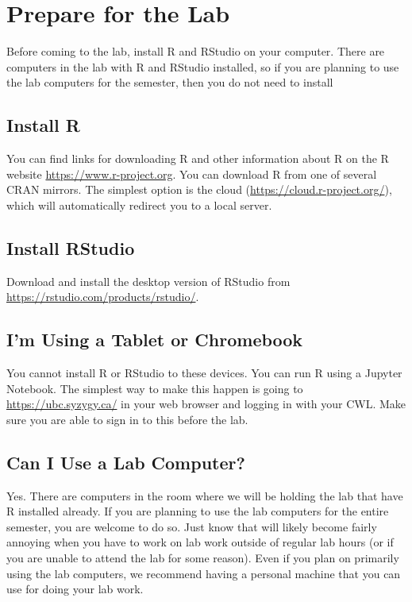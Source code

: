 \documentclass[
]{book}
\begin{document}
\hypertarget{prepare-for-the-lab}{%
\section{Prepare for the Lab}\label{prepare-for-the-lab}}

Before coming to the lab, install R and RStudio on your computer. There are computers in the lab with R and RStudio installed, so if you are planning to use the lab computers for the semester, then you do not need to install

\hypertarget{install-r}{%
\subsection{Install R}\label{install-r}}

You can find links for downloading R and other information about R on the R website \url{https://www.r-project.org}. You can download R from one of several CRAN mirrors. The simplest option is the cloud (\url{https://cloud.r-project.org/}), which will automatically redirect you to a local server.

\hypertarget{install-rstudio}{%
\subsection{Install RStudio}\label{install-rstudio}}

Download and install the desktop version of RStudio from \url{https://rstudio.com/products/rstudio/}.

\hypertarget{im-using-a-tablet-or-chromebook}{%
\subsection{I'm Using a Tablet or Chromebook}\label{im-using-a-tablet-or-chromebook}}

You cannot install R or RStudio to these devices. You can run R using a Jupyter Notebook. The simplest way to make this happen is going to \url{https://ubc.syzygy.ca/} in your web browser and logging in with your CWL. Make sure you are able to sign in to this before the lab.

\hypertarget{can-i-use-a-lab-computer}{%
\subsection{Can I Use a Lab Computer?}\label{can-i-use-a-lab-computer}}

Yes. There are computers in the room where we will be holding the lab that have R installed already. If you are planning to use the lab computers for the entire semester, you are welcome to do so. Just know that will likely become fairly annoying when you have to work on lab work outside of regular lab hours (or if you are unable to attend the lab for some reason). Even if you plan on primarily using the lab computers, we recommend having a personal machine that you can use for doing your lab work.
\end{document}
